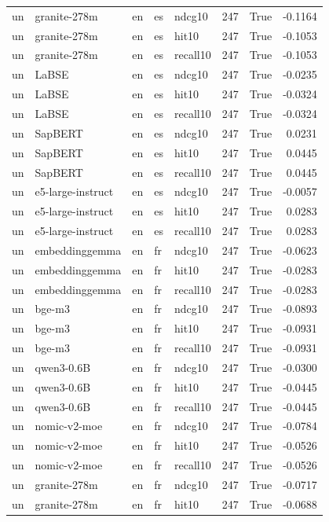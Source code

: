 \begin{tabular}{lllllrrr}
un & granite-278m & en & es & ndcg10 & 247 & True & -0.1164 \\
un & granite-278m & en & es & hit10 & 247 & True & -0.1053 \\
un & granite-278m & en & es & recall10 & 247 & True & -0.1053 \\
un & LaBSE & en & es & ndcg10 & 247 & True & -0.0235 \\
un & LaBSE & en & es & hit10 & 247 & True & -0.0324 \\
un & LaBSE & en & es & recall10 & 247 & True & -0.0324 \\
un & SapBERT & en & es & ndcg10 & 247 & True & 0.0231 \\
un & SapBERT & en & es & hit10 & 247 & True & 0.0445 \\
un & SapBERT & en & es & recall10 & 247 & True & 0.0445 \\
un & e5-large-instruct & en & es & ndcg10 & 247 & True & -0.0057 \\
un & e5-large-instruct & en & es & hit10 & 247 & True & 0.0283 \\
un & e5-large-instruct & en & es & recall10 & 247 & True & 0.0283 \\
un & embeddinggemma & en & fr & ndcg10 & 247 & True & -0.0623 \\
un & embeddinggemma & en & fr & hit10 & 247 & True & -0.0283 \\
un & embeddinggemma & en & fr & recall10 & 247 & True & -0.0283 \\
un & bge-m3 & en & fr & ndcg10 & 247 & True & -0.0893 \\
un & bge-m3 & en & fr & hit10 & 247 & True & -0.0931 \\
un & bge-m3 & en & fr & recall10 & 247 & True & -0.0931 \\
un & qwen3-0.6B & en & fr & ndcg10 & 247 & True & -0.0300 \\
un & qwen3-0.6B & en & fr & hit10 & 247 & True & -0.0445 \\
un & qwen3-0.6B & en & fr & recall10 & 247 & True & -0.0445 \\
un & nomic-v2-moe & en & fr & ndcg10 & 247 & True & -0.0784 \\
un & nomic-v2-moe & en & fr & hit10 & 247 & True & -0.0526 \\
un & nomic-v2-moe & en & fr & recall10 & 247 & True & -0.0526 \\
un & granite-278m & en & fr & ndcg10 & 247 & True & -0.0717 \\
un & granite-278m & en & fr & hit10 & 247 & True & -0.0688 \\

\end{tabular}
